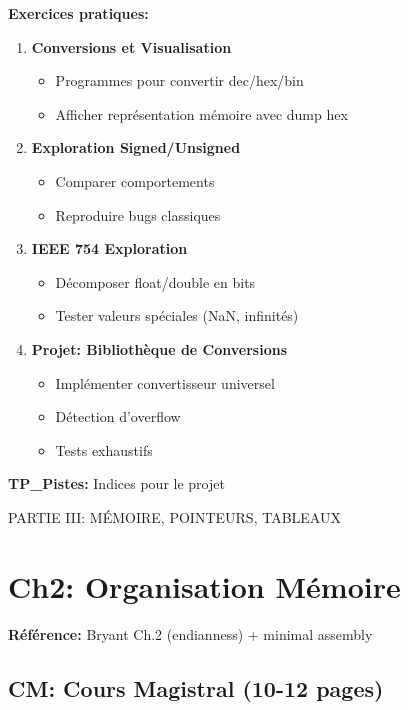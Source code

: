 \documentclass[10pt,a4paper]{article}
\begin{document}
\textbf{Exercices pratiques:}
\begin{enumerate}
\item \textbf{Conversions et Visualisation}
   \begin{itemize}
   \item Programmes pour convertir dec/hex/bin
   \item Afficher représentation mémoire avec dump hex
   \end{itemize}

\item \textbf{Exploration Signed/Unsigned}
   \begin{itemize}
   \item Comparer comportements
   \item Reproduire bugs classiques
   \end{itemize}

\item \textbf{IEEE 754 Exploration}
   \begin{itemize}
   \item Décomposer float/double en bits
   \item Tester valeurs spéciales (NaN, infinités)
   \end{itemize}

\item \textbf{Projet: Bibliothèque de Conversions}
   \begin{itemize}
   \item Implémenter convertisseur universel
   \item Détection d'overflow
   \item Tests exhaustifs
   \end{itemize}
\end{enumerate}

\textbf{TP\_Pistes:} Indices pour le projet

\newpage

\begin{partbox}
PARTIE III: MÉMOIRE, POINTEURS, TABLEAUX
\end{partbox}

\section{Ch2: Organisation Mémoire}

\textbf{Référence:} Bryant Ch.2 (endianness) + minimal assembly

\subsection*{CM: Cours Magistral (10-12 pages)}
\end{document}
